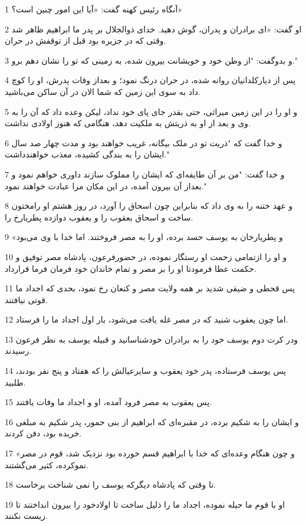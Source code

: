 \par 1 آنگاه رئیس کهنه گفت: «آیا این امور چنین است؟»
\par 2 او گفت: «ای برادران و پدران، گوش دهید. خدای ذوالجلال بر پدر ما ابراهیم ظاهر شد وقتی که در جزیره بود قبل از توقفش در حران.
\par 3 و بدوگفت: "از وطن خود و خویشانت بیرون شده، به زمینی که تو را نشان دهم برو."
\par 4 پس از دیارکلدانیان روانه شده، در حران درنگ نمود؛ و بعداز وفات پدرش، او را کوچ داد به سوی این زمین که شما الان در آن ساکن می‌باشید.
\par 5 و او را در این زمین میراثی، حتی بقدر جای پای خود نداد، لیکن وعده داد که آن را به وی و بعد از او به ذریتش به ملکیت دهد، هنگامی که هنوز اولادی نداشت.
\par 6 و خدا گفت که "ذریت تو در ملک بیگانه، غریب خواهند بود و مدت چهار صد سال ایشان را به بندگی کشیده، معذب خواهندداشت."
\par 7 و خدا گفت: "من بر آن طایفه‌ای که ایشان را مملوک سازند داوری خواهم نمود و بعداز آن بیرون آمده، در این مکان مرا عبادت خواهند نمود."
\par 8 و عهد ختنه را به وی داد که بنابراین چون اسحاق را آورد، در روز هشتم او رامختون ساخت و اسحاق یعقوب را و یعقوب دوازده پطریارخ را.
\par 9 «و پطریارخان به یوسف حسد برده، او را به مصر فروختند. اما خدا با وی می‌بود
\par 10 و او را ازتمامی زحمت او رستگار نموده، در حضورفرعون، پادشاه مصر توفیق و حکمت عطا فرمودتا او را بر مصر و تمام خاندان خود فرمان فرما قرارداد.
\par 11 پس قحطی و ضیقی شدید بر همه ولایت مصر و کنعان رخ نمود، بحدی که اجداد ما قوتی نیافتند.
\par 12 اما چون یعقوب شنید که در مصر غله یافت می‌شود، بار اول اجداد ما را فرستاد.
\par 13 ودر کرت دوم یوسف خود را به برادران خودشناسانید و قبیله یوسف به نظر فرعون رسیدند.
\par 14 پس یوسف فرستاده، پدر خود یعقوب و سایرعیالش را که هفتاد و پنج نفر بودند، طلبید.
\par 15 پس یعقوب به مصر فرود آمده، او و اجداد ما وفات یافتند.
\par 16 و ایشان را به شکیم برده، در مقبره‌ای که ابراهیم از بنی حمور، پدر شکیم به مبلغی خریده بود، دفن کردند.
\par 17 «و چون هنگام وعده‌ای که خدا با ابراهیم قسم خورده بود نزدیک شد، قوم در مصر نموکرده، کثیر می‌گشتند.
\par 18 تا وقتی که پادشاه دیگرکه یوسف را نمی شناخت برخاست.
\par 19 او با قوم ما حیله نموده، اجداد ما را ذلیل ساخت تا اولادخود را بیرون انداختند تا زیست نکنند.
